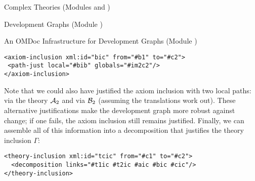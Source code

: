\begin{tchapter}[id=complex-theories,short=Complex Theories]{Complex Theories (Modules
    {} and {})}
\begin{tsection}[id=development-graphs,short=Development Graphs]{Development Graphs
    (Module {})}
\begin{tsubsection}[id=dg-omdoc,short=OMDoc Development Graphs]{An OMDoc Infrastructure
    for Development Graphs (Module {})}
\begin{lstlisting}[label=lst:thi-induced-inclusions,index={path-just,axiom-inclusion},
                   caption={The Induced Axiom Inclusions in {\myfigref{thi-proof}}.}]
<axiom-inclusion xml:id="bic" from="#b1" to="#c2">
 <path-just local="#bib" globals="#im2c2"/>
</axiom-inclusion>
\end{lstlisting}
Note that we could also have justified the axiom inclusion {} with
two local paths: via the theory ${\cal A}_2$ and via ${\cal B}_2$ (assuming the translations
work out).  These alternative justifications make the development graph more
robust against change; if one fails, the axiom inclusion still remains justified.
Finally, we can assemble all of this information into a decomposition that
justifies the theory inclusion $\Gamma$:
\begin{lstlisting}[label=lst:thi-proof,index={theory-inclusion,decomposition}
                   caption={Justifying {\element{theory-inclusion}s} via {\element{decompositions}}}]
<theory-inclusion xml:id="tcic" from="#c1" to="#c2">
  <decomposition links="#t1ic #t2ic #aic #bic #cic"/>
</theory-inclusion>
\end{lstlisting}
\end{tsubsection}
\end{tsection}
\end{tchapter}

